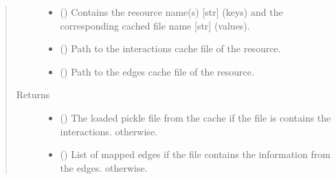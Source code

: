 \documentclass[letterpaper,10pt,english]{sphinxmanual}
\begin{document}
\begin{fulllineitems}
\begin{fulllineitems}
\begin{quote}
\begin{description}
\begin{itemize}
\item {} 
 () \textendash{} Contains the resource name(s) {[}str{]} (keys) and the
corresponding cached file name {[}str{]} (values).

\item {} 
 () \textendash{} Path to the interactions cache file of the resource.

\item {} 
 () \textendash{} Path to the edges cache file of the resource.

\end{itemize}

\item[{Returns}] \leavevmode
\begin{itemize}
\item {} 
() \textendash{} The loaded pickle file from the cache if the
file is contains the interactions.  otherwise.

\item {} 
() \textendash{} List of mapped edges if the file contains the
information from the edges. \sphinxcode{\sphinxupquote{{[}{]}}} otherwise.

\end{itemize}


\end{description}\end{quote}

\end{fulllineitems}


\begin{fulllineitems}
\label{\detokenize{main:pypath.main.PyPath.loop_edges}}
\end{fulllineitems}



\end{fulllineitems}
\end{document}
